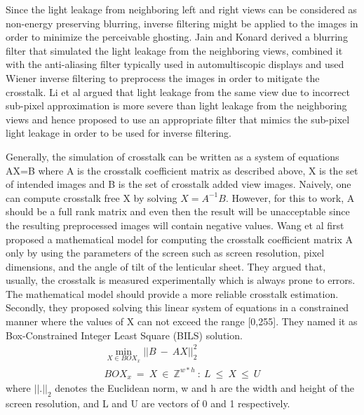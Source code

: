 Since the light leakage from neighboring left and right views can be considered as non-energy preserving blurring, inverse filtering might be applied to the images in order to minimize the perceivable ghosting. Jain and Konard \cite{jain2007crosstalk} derived a blurring filter that simulated the light leakage from the neighboring views, combined it with the anti-aliasing filter typically used in automultiscopic displays and used Wiener inverse filtering to preprocess the images in order to mitigate the crosstalk. Li et al \cite{citation-0} argued that light leakage from the same view due to incorrect sub-pixel approximation is more severe than light leakage from the neighboring views and hence proposed to use an appropriate filter that mimics the sub-pixel light leakage in order to be used for inverse filtering.

Generally, the simulation of crosstalk can be written as a system of equations AX=B where A is the crosstalk coefficient matrix as described above, X is the set of intended images and B is the set of crosstalk added view images. Naively, one can compute crosstalk free X by solving $X=A^{-1}B$. However, for this to work, A should be a full rank matrix and even then the result will be unacceptable since the resulting preprocessed images will contain negative values. Wang et al \cite{wang2014improved} first proposed a mathematical model for computing the crosstalk coefficient matrix A only by using the parameters of the screen such as screen resolution, pixel dimensions, and the angle of tilt of the lenticular sheet. They argued that, usually, the crosstalk is measured experimentally which is always prone to errors. The mathematical model should provide a more reliable crosstalk estimation. Secondly, they proposed solving this linear system of equations in a constrained manner where the values of X can not exceed the range [0,255]. They named it as Box-Constrained Integer Least Square (BILS) solution.
\begin{equation}
\begin{aligned}
\underset{X \in BOX_x}{\operatorname{min}}||B\: -\: AX||_2^2 \\
BOX_x\: = \: {X\: \in \: \mathbb{Z}^{w*h} \: : \: L\: \leq \: X\: \leq\: U }
\end{aligned}
\label{eq:bils}
\end{equation}
where $||.||_2$ denotes the Euclidean norm, w and h are the width and height of the screen resolution, and L and U are vectors of 0 and 1 respectively.